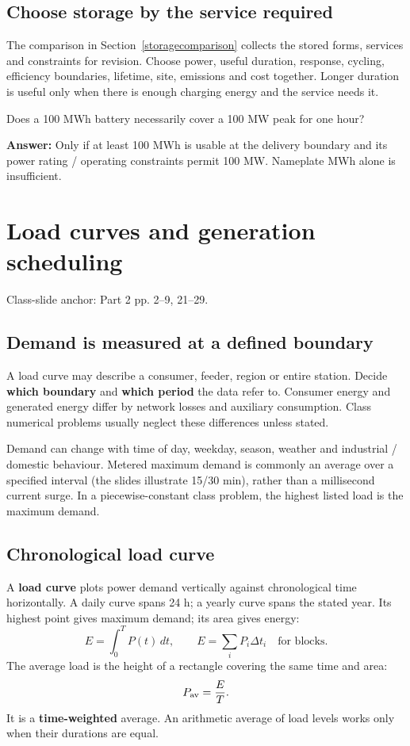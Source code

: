 \documentclass[11pt,a4paper]{article}
\newcommand{\slides}[1]{{\small\color{muted}\textsf{Class-slide anchor: #1.}}\par}
\newcommand{\chapterstart}[2]{\clearpage\section{#1}\label{#2}}
\newcommand{\checkq}[2]{\begin{tcolorbox}[breakable=false,colback=pale,colframe=teal,coltitle=white,title={Check your understanding}]#1\par\textbf{Answer:} #2\end{tcolorbox}}
\begin{document}
\subsection{Choose storage by the service required}
The comparison in Section~\ref{storagecomparison} collects the stored forms, services and constraints for revision.
Choose power, useful duration, response, cycling, efficiency boundaries, lifetime, site, emissions and cost together. Longer duration is useful only when there is enough charging energy and the service needs it.
\checkq{Does a 100 MWh battery necessarily cover a 100 MW peak for one hour?}{Only if at least 100 MWh is usable at the delivery boundary and its power rating / operating constraints permit 100 MW. Nameplate MWh alone is insufficient.}

\chapterstart{Load curves and generation scheduling}{curves}
\slides{Part 2 pp. 2--9, 21--29}
\subsection{Demand is measured at a defined boundary}
A load curve may describe a consumer, feeder, region or entire station. Decide \textbf{which boundary} and \textbf{which period} the data refer to. Consumer energy and generated energy differ by network losses and auxiliary consumption. Class numerical problems usually neglect these differences unless stated.

Demand can change with time of day, weekday, season, weather and industrial / domestic behaviour. Metered maximum demand is commonly an average over a specified interval (the slides illustrate 15/30 min), rather than a millisecond current surge. In a piecewise-constant class problem, the highest listed load is the maximum demand.

\subsection{Chronological load curve}
A \textbf{load curve} plots power demand vertically against chronological time horizontally. A daily curve spans 24 h; a yearly curve spans the stated year. Its highest point gives maximum demand; its area gives energy:
\[
E=\int_0^T P(t)\,dt,\qquad E=\sum_i P_i\Delta t_i\quad\text{for blocks}.
\]
The average load is the height of a rectangle covering the same time and area:
\[
P_{\rm av}=\frac{E}{T}.
\]
It is a \textbf{time-weighted} average. An arithmetic average of load levels works only when their durations are equal.
\end{document}
